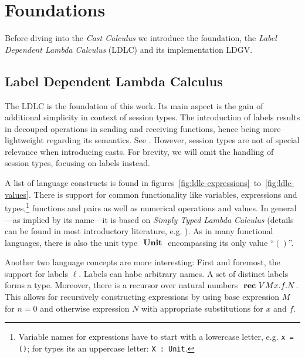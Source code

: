 \chapter{Foundations}\label{chap:foundations}

Before diving into the \emph{Cast Calculus} we introduce the foundation, the \emph{Label Dependent Lambda Calculus} (LDLC) and its implementation LDGV.

\section{Label Dependent Lambda Calculus}\label{sec:ldlc}

The LDLC is the foundation of this work. Its main aspect is the gain of additional simplicity in context of session types. The introduction of labels results in decouped operations in sending and receiving functions, hence being more lightweight regarding its semantics. See \cite{thiemann2019}. However, session types are not of special relevance when introducing casts. For brevity, we will omit the handling of session types, focusing on labels instead.

A list of language constructs is found in figures~\ref{fig:ldlc-expressions}~to~\ref{fig:ldlc-values}. There is support for common functionality like variables, expressions and types,\footnote{
Variable names for expressions have to start with a lowercase letter, e.g. \texttt{\valb x = ()}; for types its an uppercase letter: \texttt{\typeb X : Unit}.} functions and pairs as well as numerical operations and values. In general---as implied by its name---it is based on \emph{Simply Typed Lambda Calculus} (details can be found in most introductory literature, e.g. \cite{pierce2002}). As in many functional languages, there is also the unit type $\text{ \textbf{Unit} }$ encompassing its only value ``$()$''.

Another two language concepts are more interesting: First and foremost, the support for labels $\ell$. Labels can habe arbitrary names. A set of distinct labels forms a type. Moreover, there is a recursor over natural numbers $\text{ \textbf{rec} } V M x.f.N$. This allows for recursively constructing expressions by using base expression $M$ for $n=0$ and otherwise expression $N$ with appropriate substitutions for $x$ and $f$.

